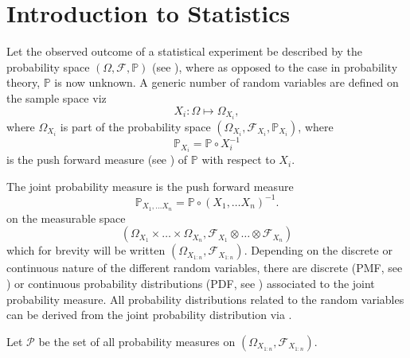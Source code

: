 \chapter{Introduction to Statistics}
\label{chp:statistics_introduction}
Let the observed outcome of a statistical experiment be described by the probability space $(\Omega, \mathcal{F}, \mathbb{P})$ (see ), where as opposed to the case in probability theory, $\mathbb{P}$ is now unknown. A generic number of random variables are defined on the sample space viz~\cite{orbanz2009functional,tausk2023basic, drewitz2019introduction,chan2021introduction}
\begin{equation}
	X_i: \Omega \mapsto \Omega_{X_i},
\end{equation} 
where $\Omega_{X_i}$ is part of the probability space $(\Omega_{X_i},\mathcal{F}_{X_i},\mathbb{P}_{X_i})$, where
\begin{equation}
	\mathbb{P}_{X_i} = \mathbb{P}\circ X_i^{-1}
\end{equation}
is the push forward measure (see ) of $\mathbb{P}$ with respect to $X_i$. 
\begin{definition}
	The joint probability measure is the push forward measure
	\begin{equation}
		\mathbb{P}_{X_1,\dots X_n} = \mathbb{P}\circ(X_1,\dots X_n)^{-1}.
	\end{equation}
	on the measurable space 
	\begin{equation}
		(\Omega_{X_1}\times \dots\times \Omega_{X_n}, \mathcal{F}_{X_1}\otimes \dots \otimes \mathcal{F}_{X_n})
	\end{equation}
	which for brevity will be written $(\Omega_{X_{1:n}},\mathcal{F}_{X_{1:n}})$. Depending on the discrete or continuous nature of the different random variables, there are discrete (PMF, see ) or continuous probability distributions (PDF, see ) associated to the joint probability measure. All probability distributions related to the random variables can be derived from the joint probability distribution via .
\end{definition}

\begin{definition}
	Let $\mathcal{P}$ be the set of all probability measures on $(\Omega_{X_{1:n}},\mathcal{F}_{X_{1:n}})$.
\end{definition}

